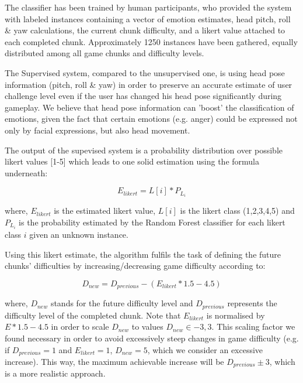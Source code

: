 \documentclass[letterpaper]{article}
\begin{document}
The classifier has been trained by human participants, who provided the system with labeled instances containing a vector of emotion estimates, head pitch, roll \& yaw calculations, the current chunk difficulty, and a likert value attached to each completed chunk. Approximately 1250 instances have been gathered, equally distributed among all game chunks and difficulty levels.

The Supervised system, compared to the unsupervised one, is using head pose information (pitch, roll \& yaw) in order to preserve an accurate estimate of user challenge level even if the user has changed his head pose significantly during gameplay. We believe that head pose information can 'boost' the classification of emotions, given the fact that certain emotions (e.g. anger) could be expressed not only by facial expressions, but also head movement.

The output of the supevised system is a probability distribution over possible likert values [1-5] which leads to one solid estimation using the formula underneath:
\begin{center}
\begin{equation*}
E_{likert} = L[i]*P_{L_i}
\end{equation*}
\end{center}
where, $E_{likert}$ is the estimated likert value, $L[i]$ is the likert class (1,2,3,4,5) and $P_{L_i}$ is the probability estimated by the Random Forest classifier for each likert class $i$ given an unknown instance.

Using this likert estimate, the algorithm fulfils the task of defining the future chunks' difficulties by increasing/decreasing game difficulty according to:
\begin{center}
\begin{equation*}
D_{new} = D_{previous}-(E_{likert}*1.5-4.5)
\end{equation*}
\end{center}
where, $D_{new}$ stands for the future difficulty level and $D_{previous}$ represents the difficulty level of the completed chunk. 
Note that $E_{likert}$ is normalised by $E*1.5-4.5$ in order to scale $D_{new}$ to values $D_{new}\in{-3,3}$.
This scaling factor we found necessary in order to avoid excessively steep changes in game difficulty (e.g. if $D_{previous}=1$ and $E_{likert}=1$, $D_{new} = 5$, which we consider an excessive increase). This way, the maximum achievable increase will be $D_{previous}\pm3$, which is a more realistic approach.
\end{document}
